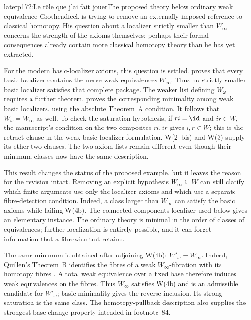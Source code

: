 \begin{dcomment}{later}{p172:Le rôle que j'ai fait jouer}{The proposed theory below ordinary weak equivalence}
Grothendieck is trying to remove an externally imposed reference to classical homotopy. His question about a localizer strictly smaller than $W_\infty$ concerns the strength of the axioms themselves: perhaps their formal consequences already contain more classical homotopy theory than he has yet extracted.

For the modern basic-localizer axioms, this question is settled. \citet[Definition~1.1.3 and Theorem~2.2.11]{Cisinski2004Minimal} proves that every basic localizer contains the nerve weak equivalences $W_\infty$. Thus no strictly smaller basic localizer satisfies that complete package. The weaker list defining $W_\omega$ requires a further theorem. \citet[Theorem~1.10 and Remark~1.11]{Cisinski2009LocallyConstant} proves the corresponding minimality among weak basic localizers, using the absolute Theorem~A condition. It follows that $W_\omega=W_\infty$ as well. To check the saturation hypothesis, if $ri=\id$ and $ir\in W$, the manuscript's condition on the two composites $ri,ir$ gives $i,r\in W$; this is the retract clause in the weak-basic-localizer formulation. W(2~bis) and W(3) supply its other two clauses. The two axiom lists remain different even though their minimum classes now have the same description.

This result changes the status of the proposed example, but it leaves the reason for the revision intact. Removing an explicit hypothesis $W_\infty\subseteq W$ can still clarify which finite arguments use only the localizer axioms and which use a separate fibre-detection condition. Indeed, a class larger than $W_\infty$ can satisfy the basic axioms while failing W(4b). The connected-components localizer used below gives an elementary instance. The ordinary theory is minimal in the order of classes of equivalences; further localization is entirely possible, and it can forget information that a fibrewise test retains.

The same minimum is obtained after adjoining W(4b): $W'_\omega=W_\infty$. Indeed, Quillen's Theorem~B identifies the fibres of a weak $W_\infty$-fibration with its homotopy fibres \citep[Theorem~2.3.2]{Cisinski2004Minimal}. A total weak equivalence over a fixed base therefore induces weak equivalences on the fibres. Thus $W_\infty$ satisfies W(4b) and is an admissible candidate for $W'_\omega$; basic minimality gives the reverse inclusion. Its strong saturation is the same class. The homotopy-pullback description also supplies the strongest base-change property intended in footnote~84.


\end{dcomment}
